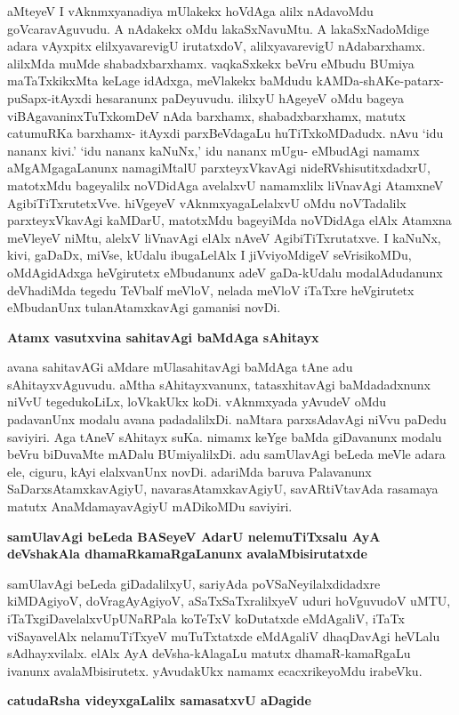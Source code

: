 aMteyeV I vAknmxyanadiya mUlakekx hoVdAga alilx nAdavoMdu goVcaravAguvudu. A nAdakekx oMdu lakaSxNavuMtu. A lakaSxNadoMdige adara vAyxpitx elilxyavarevigU irutatxdoV, alilxyavarevigU nAdabarxhamx. alilxMda muMde shabadxbarxhamx. vaqkaSxkekx beVru eMbudu BUmiya maTaTxkikxMta keLage idAdxga, meVlakekx baMdudu kAMDa-shAKe-patarx-puSapx-itAyxdi hesaranunx paDeyuvudu. ililxyU hAgeyeV oMdu bageya viBAgavaninxTuTxkomDeV nAda barxhamx, shabadxbarxhamx, matutx catumuRKa barxhamx- itAyxdi parxBeVdagaLu huTiTxkoMDadudx. nAvu `idu nananx kivi.' `idu nananx kaNuNx,' idu nananx mUgu- eMbudAgi namamx aMgAMgagaLanunx namagiMtalU parxteyxVkavAgi nideRVshisutitxdadxrU, matotxMdu bageyalilx noVDidAga avelalxvU namamxlilx liVnavAgi AtamxneV AgibiTiTxrutetxVve. hiVgeyeV vAknmxyagaLelalxvU oMdu noVTadalilx parxteyxVkavAgi kaMDarU, matotxMdu bageyiMda noVDidAga elAlx Atamxna meVleyeV niMtu, alelxV liVnavAgi elAlx nAveV AgibiTiTxrutatxve. I kaNuNx, kivi, gaDaDx, miVse, kUdalu ibugaLelAlx I jiVviyoMdigeV seVrisikoMDu, oMdAgidAdxga heVgirutetx eMbudanunx adeV gaDa-kUdalu modalAdudanunx deVhadiMda tegedu TeVbalf meVloV, nelada meVloV iTaTxre heVgirutetx eMbudanUnx tulanAtamxkavAgi gamanisi novDi.

{\bf Atamx vasutxvina sahitavAgi baMdAga sAhitayx}

avana sahitavAGi aMdare mUlasahitavAgi baMdAga tAne adu sAhitayxvAguvudu. aMtha sAhitayxvanunx, tatasxhitavAgi baMdadadxnunx niVvU tegedukoLiLx, loVkakUkx koDi. vAknmxyada yAvudeV oMdu padavanUnx modalu avana padadalilxDi. naMtara parxsAdavAgi niVvu paDedu saviyiri. Aga tAneV sAhitayx suKa. nimamx keYge baMda giDavanunx modalu beVru biDuvaMte mADalu BUmiyalilxDi. adu samUlavAgi beLeda meVle adara ele, ciguru, kAyi elalxvanUnx novDi. adariMda baruva Palavanunx SaDarxsAtamxkavAgiyU, navarasAtamxkavAgiyU, savARtiVtavAda rasamaya matutx AnaMdamayavAgiyU mADikoMDu saviyiri.

{\bf samUlavAgi beLeda BASeyeV AdarU nelemuTiTxsalu AyA deVshakAla dhamaRkamaRgaLanunx avalaMbisirutatxde}

samUlavAgi beLeda giDadalilxyU, sariyAda poVSaNeyilalxdidadxre kiMDAgiyoV, doVragAyAgiyoV, aSaTxSaTxralilxyeV uduri hoVguvudoV uMTU, iTaTxgiDavelalxvUpUNaRPala koTeTxV koDutatxde eMdAgaliV, iTaTx viSayavelAlx nelamuTiTxyeV muTuTxtatxde eMdAgaliV dhaqDavAgi heVLalu sAdhayxvilalx. elAlx AyA deVsha-kAlagaLu matutx dhamaR-kamaRgaLu ivanunx avalaMbisirutetx. yAvudakUkx namamx ecacxrikeyoMdu irabeVku.

{\bf catudaRsha videyxgaLalilx samasatxvU aDagide}

